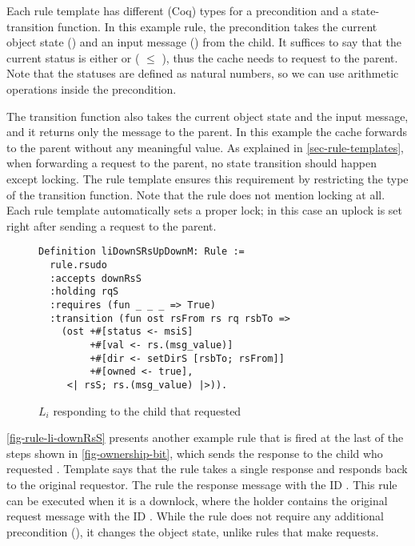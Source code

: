Each rule template has different (Coq) types for a precondition and a state-transition function.
In this example rule, the precondition takes the current object state () and an input message () from the child.
It suffices to say that the current status is either \stI{} or \stNP{} ( $\leq$ ), thus the cache needs to request to the parent.
Note that the statuses are defined as natural numbers, so we can use arithmetic operations inside the precondition.

The transition function also takes the current object state and the input message, and it returns only the message to the parent.
In this example the cache forwards  to the parent without any meaningful value.
As explained in \autoref{sec-rule-templates}, when forwarding a request to the parent, no state transition should happen except locking.
The rule template ensures this requirement by restricting the type of the transition function.
Note that the rule does not mention locking at all.
Each rule template automatically sets a proper lock; in this case an uplock is set right after sending a request to the parent.

\begin{figure}[h]
  \centering
\begin{lstlisting}
Definition liDownSRsUpDownM: Rule :=
  rule.rsudo
  :accepts downRsS
  :holding rqS
  :requires (fun _ _ _ => True)
  :transition (fun ost rsFrom rs rq rsbTo =>
    (ost +#[status <- msiS]
         +#[val <- rs.(msg_value)]
         +#[dir <- setDirS [rsbTo; rsFrom]]
         +#[owned <- true],
     <| rsS; rs.(msg_value) |>)).
\end{lstlisting}
  \caption{$L_i$ responding to the child that requested }
  \label{fig-rule-li-downRsS}
\end{figure}

\autoref{fig-rule-li-downRsS} presents another example rule that is fired at the last of the steps shown in \autoref{fig-ownership-bit}, which sends the response to the child who requested .
Template  says that the rule takes a single response and responds back to the original requestor.
The rule  the response message with the ID .
This rule can be executed when it is  a downlock, where the holder contains the original request message with the ID .
While the rule does not require any additional precondition (), it changes the object state, unlike rules that make requests.

